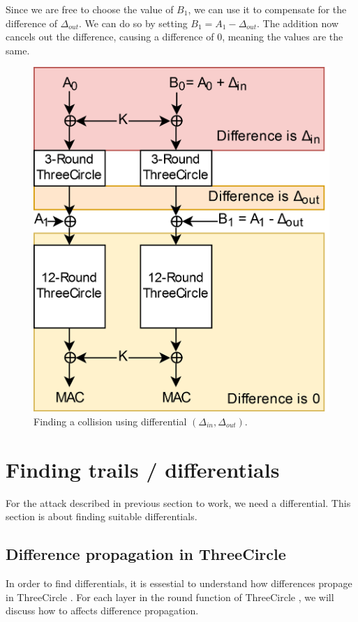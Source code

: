 \documentclass{report}
\newcommand{\ThreeCircle}{{\sc ThreeCircle} }
\begin{document}
Since we are free to choose the value of $B_1$, we can use it to compensate for the difference of $\Delta_{out}$. We can do so by setting $B_1 = A_1 - \Delta_{out}$. 
The addition now cancels out the difference, causing a difference of 0, meaning the values are the same.

\begin{figure}
\centering
\includegraphics[scale=0.20]{imgs/Collision.png}
\caption{Finding a collision using differential $(\Delta_{in}, \Delta_{out})$.}
\label{fig:coll}
\end{figure}

\section{Finding trails / differentials}
For the attack described in previous section to work, we need a differential. This section is about finding suitable differentials.

\subsection{Difference propagation in \ThreeCircle}
In order to find differentials, it is essestial to understand how differences propage in \ThreeCircle. For each layer in the round function of \ThreeCircle, we will discuss how to affects difference propagation.
\end{document}
